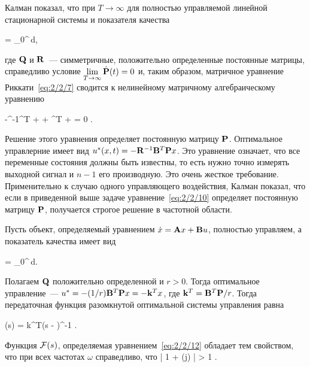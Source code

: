 Калман\cite{KALMAN1} показал, что при $T \to \infty$ для полностью управляемой линейной стационарной системы и показателя качества

\beqn
    \funcF =  \int\limits_0^\infty {}\,d\tau \mbox{,}
\eeqn

где $\mathbf{Q}$ и $\mathbf{R}$~--- симметричные, положительно определенные постоянные матрицы, справедливо условие $\lim\limits_{T \to \infty}\dot{\mathbf{P}}(t) = 0$ и, таким образом, матричное уравнение Риккати~\ref{eq:2/2/7} сводится к нелинейному матричному алгебраическому уравнению

    -^{-1}^T +  + ^T +  = 0 \mbox{.}
\eeq

Решение этого уравнения определяет постоянную матрицу $\mathbf{P}$. Оптимальное управлерние имеет вид $u^{*}(x, t) = -\mathbf{R}^{-1}\mathbf{B}^T\mathbf{P} x$. Это уравнение означает, что все переменные состояния должны быть известны, то есть нужно точно измерять выходной сигнал и $n-1$ его производную. Это очень жесткое требование. Применительно к случаю одного управляющего воздействия, Калман\cite{KALMAN2} показал, что если в приведенной выше задаче уравнение~\ref{eq:2/2/10} определяет постоянную матрицу $\mathbf{P}$, получается строгое решение в частотной области.

\br

Пусть объект, определяемый уравнением $\dot{x} = \mathbf{A}x + \mathbf{B} u$, полностью управляем, а показатель качества имеет вид

    \funcF =  \int\limits_0^\infty {}\,d\tau \mbox{.}
\eeq

Полагаем $\mathbf{Q}$ положительно определенной и $r > 0$. Тогда оптимальное управление~--- $u^{*} = -(1/r) \mathbf{B}^T\mathbf{P} x = -\mathbf{k}^Tx$, где $\mathbf{k}^T = \mathbf{B}^T\mathbf{P} / r$. Тогда передаточная функция разомкнутой оптимальной системы управления равна\cite{XU}

    \funcT(s) = k^T(s - )^{-1} \mbox{.}
\eeq

\begin{teo}
    Функция $\mathcal{F}(s)$, определяемая уравнением~\ref{eq:2/2/12} обладает тем свойством, что при всех частотах $\omega$ справедливо, что
    	\bigl| 1 + \funcT(j\omega) \bigr| > 1 \mbox{.}
	\eeq
\end{teo}


